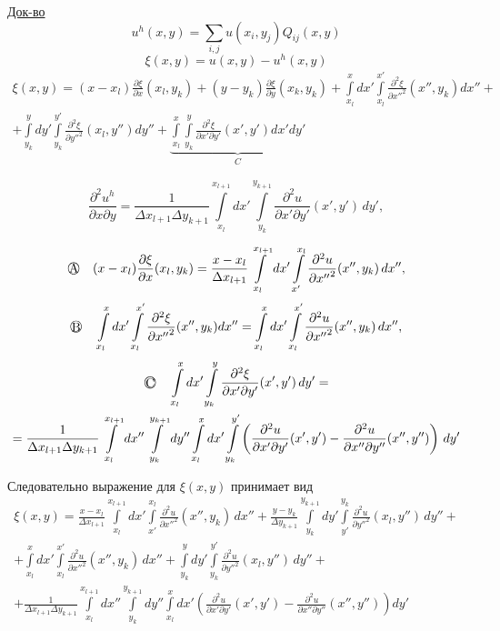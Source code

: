 \documentclass[12pt, a4paper]{article}
\newcommand{\Int}{\int\limits}
\newcommand{\Sum}{\sum\limits}
\begin{document}
\underline{Док-во}
\[ u^h(x,y) = \Sum_{i, j} u(x_i, y_j) Q_{ij}(x, y) \]
\[ \xi (x, y) = u(x, y) - u^h(x,y) \]
\begin{multline*}
	\xi(x, y) = (x - x_l) \frac{\partial \xi}{\partial x} (x_l, y_k) + (y - y_k) \frac{\partial \xi}{\partial y} (x_k, y_k) + \Int_{x_l}^{x} dx' \Int_{x_l}^{x'} \frac{\partial^2 \xi}{{\partial x''}^2} (x'', y_k) dx'' + \\
	+ \Int_{y_k}^{y}dy' \Int_{y_k}^{y'} \frac{\partial ^2 \xi}{{\partial y''}^2}(x_l, y'') d y'' + \underbrace{\Int_{x_l}^{x} \Int_{y_k}^{y} \frac{\partial ^2 \xi}{\partial x' \partial y'} (x', y') dx' dy'}_{C}
\end{multline*}

\[\frac{\partial^2 u^h}{\partial x \partial y} = \frac{1}{\Delta x_{l+1} \Delta y_{k+1}} \Int_{x_l}^{x_{l+1}} dx' \Int_{y_k}^{y_{k+1}} \frac{\partial^2 u}{\partial x' \partial y'}(x', y') \, dy',\]


\[\raisebox{.5pt}{\textcircled{\raisebox{-.9pt} {A}}} \quad (x - x_l) \frac{\partial \xi}{\partial x}(x_l, y_k) = \frac{x - x_l}{\Delta x_{l+1}}
\Int_{x_l}^{x_{l+1}} dx' \Int_{x'}^{x_l} \frac{\partial^2 u}{{\partial x''}^2}(x'', y_k) \, dx'',\]
\[\raisebox{.5pt}{\textcircled{\raisebox{-1.5pt} {B}}} \quad \Int_{x_l}^x dx' \Int_{x_l}^{x'} \frac{\partial^2 \xi}{{\partial x''}^2}(x'', y_k) dx'' = 
\Int_{x_l}^x dx' \Int_{x_l}^{x'} \frac{\partial^2 u}{{\partial x''}^2}(x'', y_k) \, dx'',\]
\begin{multline*}
	\raisebox{.5pt}{\textcircled{\raisebox{-1.5pt} {C}}}
	\quad \Int_{x_l}^x dx' \Int_{y_k}^y \frac{\partial^2 \xi}{\partial x' \partial y'}(x', y') \, dy' = \\
	= \frac{1}{\Delta x_{l+1} \Delta y_{k+1}} \Int_{x_l}^{x_{l+1}} dx'' \Int_{y_k}^{y_{k+1}} dy'' \Int_{x_l}^x dx' \Int_{y_k}^{y'} \left( \frac{\partial^2 u}{\partial x' \partial y'}(x', y') - \frac{\partial^2 u}{\partial x'' \partial y''}(x'', y'') \right) \, dy'
\end{multline*}

Следовательно выражение для $\xi (x,y)$ принимает вид
\begin{multline*}
	\xi(x, y) = \frac{x - x_l}{\Delta x_{l+1}} \Int_{x_l}^{x_{l+1}} dx' \Int_{x'}^{x_l} \frac{\partial^2 u}{{\partial x''}^2}(x'', y_k) \, dx'' + \frac{y - y_k}{\Delta y_{k+1}} \Int_{y_k}^{y_{k+1}} dy' \Int_{y'}^{y_k} \frac{\partial^2 u}{{\partial y''}^2}(x_l, y'') \, dy'' + \\
	+ \Int_{x_l}^x dx' \Int_{x_l}^{x'} \frac{\partial^2 u}{{\partial x''}^2}(x'', y_k) \, dx'' + \Int_{y_k}^y dy' \Int_{y_k}^{y'} \frac{\partial^2 u}{{\partial y''}^2}(x_l, y'') \, dy'' + \\ 
	+ \frac{1}{\Delta x_{l+1} \Delta y_{k+1}} \Int_{x_l}^{x_{l+1}} dx'' \Int_{y_k}^{y_{k+1}} dy'' \Int_{x_l}^x dx' \left( \frac{\partial^2 u}{\partial x' \partial y'}(x', y') - \frac{\partial^2 u}{\partial x'' \partial y''}(x'', y'') \right) dy'
\end{multline*}
\end{document}
